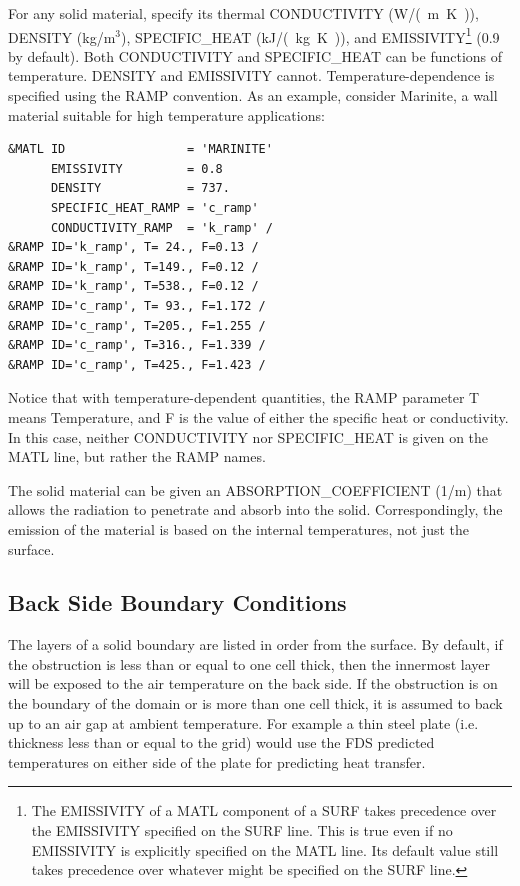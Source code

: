 \documentclass[11pt]{book}
\begin{document}
For any solid material, specify its thermal {\ct CONDUCTIVITY} (\si{W/(m.K)}), {\ct DENSITY} (kg/m$^3$), {\ct SPECIFIC\_HEAT} (\si{kJ/(kg.K)}), and {\ct EMISSIVITY}\footnote{The {\ct EMISSIVITY} of a {\ct MATL} component of a {\ct SURF} takes precedence over the {\ct EMISSIVITY} specified on the {\ct SURF} line. This is true even if no {\ct EMISSIVITY} is explicitly specified on the {\ct MATL} line. Its default value still takes precedence over whatever might be specified on the {\ct SURF} line.} (0.9 by default). Both {\ct CONDUCTIVITY} and {\ct SPECIFIC\_HEAT} can be functions of temperature. {\ct DENSITY} and {\ct EMISSIVITY} cannot. Temperature-dependence is specified using the {\ct RAMP} convention. As an example, consider Marinite, a wall material suitable for high temperature applications:
\begin{lstlisting}
&MATL ID                 = 'MARINITE'
      EMISSIVITY         = 0.8
      DENSITY            = 737.
      SPECIFIC_HEAT_RAMP = 'c_ramp'
      CONDUCTIVITY_RAMP  = 'k_ramp' /
&RAMP ID='k_ramp', T= 24., F=0.13 /
&RAMP ID='k_ramp', T=149., F=0.12 /
&RAMP ID='k_ramp', T=538., F=0.12 /
&RAMP ID='c_ramp', T= 93., F=1.172 /
&RAMP ID='c_ramp', T=205., F=1.255 /
&RAMP ID='c_ramp', T=316., F=1.339 /
&RAMP ID='c_ramp', T=425., F=1.423 /
\end{lstlisting}
Notice that with temperature-dependent quantities, the {\ct RAMP} parameter {\ct T} means Temperature, and {\ct F} is the value of either the specific heat or conductivity. In this case, neither {\ct CONDUCTIVITY} nor {\ct SPECIFIC\_HEAT} is given on the {\ct MATL} line, but rather the {\ct RAMP} names.

The solid material can be given an {\ct ABSORPTION\_COEFFICIENT} (1/m) that allows the radiation to penetrate and absorb into the solid. Correspondingly, the emission of the material is based on the internal temperatures, not just the surface.




\subsection{Back Side Boundary Conditions}
\label{info:BACKING}

The layers of a solid boundary are listed in order from the surface. By default, if the obstruction is less than or equal to one cell thick, then the innermost layer will be exposed to the air temperature on the back side.  If the obstruction is on the boundary of the domain or is more than one cell thick, it is assumed to back up to an air gap at ambient temperature. For example a thin steel plate (i.e. thickness less than or equal to the grid) would use the FDS predicted temperatures on either side of the plate for predicting heat transfer.
\end{document}
